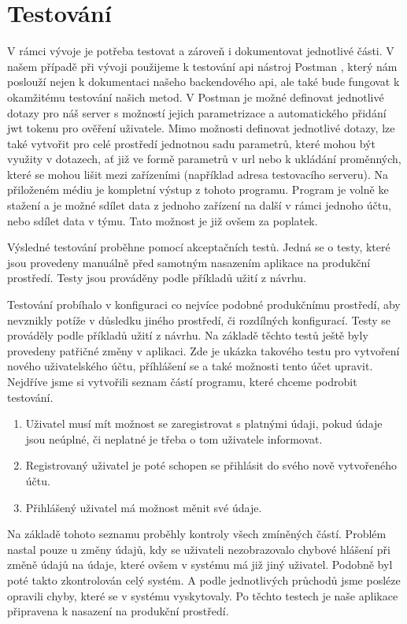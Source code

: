 \section{Testování}

V rámci vývoje je potřeba testovat a zároveň i dokumentovat jednotlivé části. V našem případě při vývoji použijeme
k testování \gls{api} nástroj Postman \cite{postmanSW}, který nám poslouží nejen k dokumentaci našeho backendového \gls{api},
ale také bude fungovat k okamžitému testování našich metod. V Postman je možné definovat jednotlivé dotazy pro náš server s možností
jejich parametrizace a automatického přidání \gls{jwt} tokenu pro ověření uživatele. Mimo možnosti definovat jednotlivé dotazy, lze také vytvořit
pro celé prostředí jednotnou sadu parametrů, které mohou být využity v dotazech, ať již ve formě parametrů v \gls{url} nebo k ukládání
proměnných, které se mohou lišit mezi zařízeními (například adresa testovacího serveru). Na přiloženém médiu je kompletní výstup z
tohoto programu. Program je volně ke stažení a je možné sdílet data z jednoho zařízení na další v rámci jednoho účtu, nebo sdílet data
v týmu. Tato možnost je již ovšem za poplatek.

Výsledné testování proběhne pomocí akceptačních testů. Jedná se o testy,
které jsou provedeny manuálně před samotným nasazením aplikace na produkční prostředí. Testy jsou prováděny podle příkladů užití z návrhu.

Testování probíhalo v konfiguraci co nejvíce podobné produkčnímu pro\-středí, aby nevznikly potíže v důsledku jiného prostředí, či
rozdílných konfigurací. Testy se prováděly podle příkladů užití z návrhu. Na základě těchto testů ještě byly provedeny patřičné změny v aplikaci.
Zde je ukázka takového testu pro vytvoření nového uživatelského účtu, příhlášení se a také možnosti tento účet upravit.
Nejdříve jsme si vytvořili seznam částí programu, které chceme podrobit testování.
\begin{enumerate}
    \item Uživatel musí mít možnost se zaregistrovat s platnými údaji, pokud údaje jsou neúplné, či neplatné je třeba o tom uživatele informovat.
    \item Registrovaný uživatel je poté schopen se přihlásit do svého nově vytvořeného účtu.
    \item Přihlášený uživatel má možnost měnit své údaje.
\end{enumerate}
Na základě tohoto seznamu proběhly kontroly všech zmíněných částí. Problém nastal pouze u změny údajů, kdy se uživateli nezobrazovalo chybové
hlášení při změně údajů na údaje, které ovšem v systému má již jiný uživatel. Podobně byl poté takto zkontrolován celý systém.
A podle jednotlivých průchodů jsme posléze opravili chyby, které se v systému vyskytovaly. Po těchto testech je naše aplikace
připravena k nasazení na produkční prostředí.


